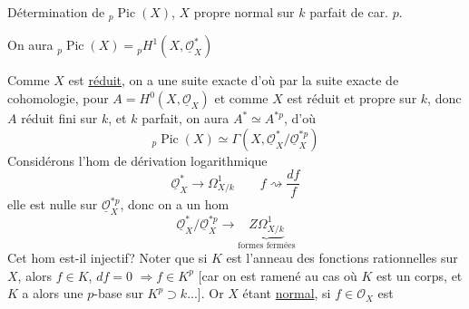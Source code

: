 Détermination de ${}_p\operatorname{Pic}(X)$, $X$ propre normal sur $k$ parfait de car. $p$.

On aura ${}_p\operatorname{Pic}(X)={}_pH^1(X,\underline{\mathcal O}_X^*)$

Comme $X$ est \uline{réduit}, on a une suite exacte
d'où par la suite exacte de cohomologie, pour $A=H^0(X,\underline{\mathcal O}_X)$
et comme $X$ est réduit et propre sur $k$, donc $A$ réduit
fini  sur $k$, et $k$ parfait, on aura
$A^*\simeq A^{*p}$, d'où
\[
{}_p\operatorname{Pic}(X)\simeq\Gamma(X,\underline{\mathcal O}_X^*/\underline{\mathcal O}_X^{*p})
\]
Considérons l'hom de dérivation logarithmique
\[
\underline{\mathcal O}_X^*\longrightarrow\Omega^1_{X/k}\qquad
f\rightsquigarrow\frac{df}{f}
\]
elle est nulle sur $\underline{\mathcal O}_X^{*p}$, donc on a un hom
\[
\underline{\mathcal O}_X^*/\underline{\mathcal O}_X^{*p}\longrightarrow
\underbrace{Z\Omega^1_{X/k}}_{\text{formes fermées}}
\]
Cet hom est-il injectif? Noter que si $K$ est l'anneau
des fonctions rationnelles sur $X$, alors $f\in K$, $df=0$
$\Rightarrow f\in K^p$ [car  on est ramené au cas où $K$
est un corps, et $K$  a alors une
$p$-base sur $K^p\supset k$...]. Or $X$ étant \uline{normal}, si $f\in\mathcal O_X$ est
